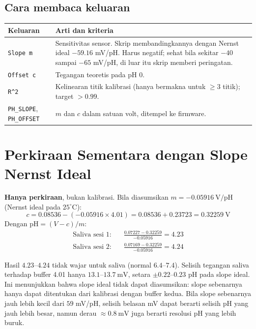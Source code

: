 \documentclass[12pt,a4paper]{article}
\begin{document}
\subsection{Cara membaca keluaran}
\begin{center}
\begin{tabular}{@{}lp{9cm}@{}}
\toprule
Keluaran & Arti dan kriteria \\
\midrule
\texttt{Slope m} & Sensitivitas sensor. Skrip membandingkannya dengan Nernst ideal $-59.16$ mV/pH. Harus negatif; sehat bila sekitar $-40$ sampai $-65$ mV/pH, di luar itu skrip memberi peringatan. \\
\texttt{Offset c} & Tegangan teoretis pada pH $0$. \\
\texttt{R\textasciicircum 2} & Kelinearan titik kalibrasi (hanya bermakna untuk $\geq 3$ titik); target $> 0.99$. \\
\texttt{PH\_SLOPE}, \texttt{PH\_OFFSET} & $m$ dan $c$ dalam satuan volt, ditempel ke firmware. \\
\bottomrule
\end{tabular}
\end{center}

\section{Perkiraan Sementara dengan Slope Nernst Ideal}

\textbf{Hanya perkiraan}, bukan kalibrasi. Bila diasumsikan $m = -0.05916\ \text{V/pH}$ (Nernst ideal pada $25^\circ\text{C}$):
\begin{equation}
c = 0.08536 - (-0.05916 \times 4.01) = 0.08536 + 0.23723 = 0.32259\ \text{V}
\end{equation}
Dengan $\text{pH} = (V - c)/m$:
\begin{align*}
\text{Saliva sesi 1:}\quad & \frac{0.07227 - 0.32259}{-0.05916} = 4.23 \\
\text{Saliva sesi 2:}\quad & \frac{0.07169 - 0.32259}{-0.05916} = 4.24
\end{align*}

Hasil $4.23$--$4.24$ tidak wajar untuk saliva (normal $6.4$--$7.4$). Selisih tegangan saliva terhadap buffer 4.01 hanya $13.1$--$13.7\ \text{mV}$, setara $\pm 0.22$--$0.23$ pH pada slope ideal. Ini menunjukkan bahwa slope ideal tidak dapat diasumsikan: slope sebenarnya hanya dapat ditentukan dari kalibrasi dengan buffer kedua. Bila slope sebenarnya jauh lebih kecil dari $59$ mV/pH, selisih belasan mV dapat berarti selisih pH yang jauh lebih besar, namun derau $\approx 0.8\ \text{mV}$ juga berarti resolusi pH yang lebih buruk.
\end{document}
